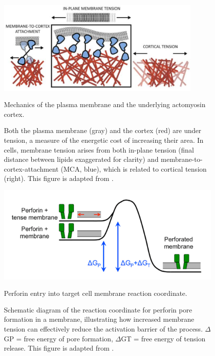 \begin{figure}[htbp]
	\centering
	\includegraphics[width=0.9\textwidth]{../figures/chapter2/membranecorticaltension.png}
	\caption{Mechanics of the plasma membrane and the underlying actomyosin cortex.}
	\caption*{Both the plasma membrane (gray) and the cortex (red) are under tension, a measure of the energetic cost of increasing their area. In cells, membrane tension arises from both in-plane tension (final distance between lipids exaggerated for clarity) and membrane-to-cortex-attachment (MCA, blue), which is related to cortical tension (right). This figure is adapted from \cite{Sitarska2020}.}
	\label{fig:membranecorticaltension}
\end{figure}

\begin{figure}[htbp]
	\centering
	\includegraphics[width=\textwidth]{../figures/chapter2/reactioncoordinate.png}
	\caption{Perforin entry into target cell membrane reaction coordinate.}
	\caption*{Schematic diagram of the reaction coordinate for perforin pore formation in a membrane, illustrating how increased membrane tension can effectively reduce the activation barrier of the process. $\Delta$GP = free energy of pore formation, $\Delta$GT = free energy of tension release. This figure is adapted from \cite{Basu2016}.}
	\label{fig:reactioncoordinate}
\end{figure}


